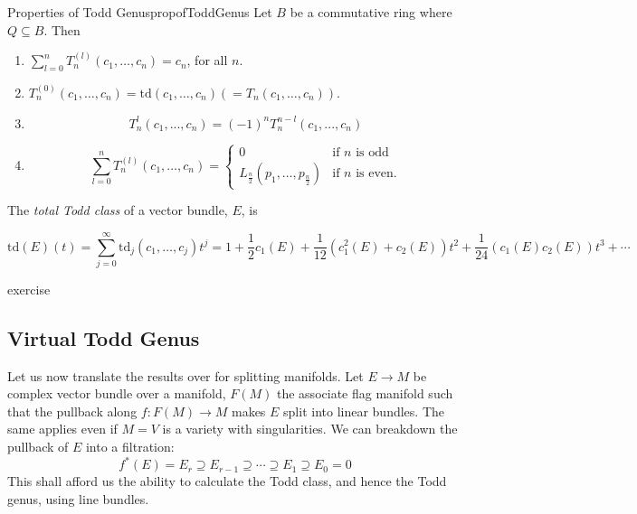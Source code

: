 \documentclass{book}
\newcommand{\sse}{\subseteq}
\begin{document}
\begin{prop}{Properties of Todd Genus}{propofToddGenus}
  Let $B$ be a commutative ring where $Q \sse B$. Then
  \begin{enumerate}
  \item $\sum_{l=0}^n T_n^{(l)}(c_1,\ldots,c_n) = c_n$, for all $n$.

  \item $T_n^{(0)}(c_1,\ldots,c_n) = \text{td}(c_1,\ldots,c_n) (= T_n(c_1,\ldots,c_n))$.
    \item
  \[
    T_n^{l}(c_1, ..., c_n)=(-1)^n T_n^{n-l}(c_1, ..., c_n)
  \]
  \item
  \[
      \sum_{l=0}^n T_n^{(l)}(c_1,\ldots,c_n) = \begin{cases}
          0 & \text{if }n\text{ is odd} \\
          L_{\frac{n}{2}}(p_1,\ldots,p_{\frac{n}{2}}) & \text{if }n\text{ is even.}
      \end{cases}
  \]
  \end{enumerate}

  The \textit{total Todd class} of a vector bundle, $E$, is

\[
    \text{td}(E)(t) = \sum_{j=0}^{\infty} \text{td}_j(c_1,\ldots,c_j)t^j = 1 + \frac{1}{2}c_1(E) + \frac{1}{12}(c_1^2(E) + c_2(E))t^2 + \frac{1}{24}(c_1(E)c_2(E))t^3 + \cdots
\]

\end{prop}

\begin{Proof}
  exercise
\end{Proof}


\subsection{Virtual Todd Genus}\label{sec:virtToddGenus}

Let us now translate the results over for splitting manifolds. Let $E \to M$ be complex vector bundle over a
manifold, $F(M)$ the associate flag manifold such that the pullback along $f: F(M) \to M$ makes $E$ split into
linear bundles. The same applies even if $M = V$ is a variety with singularities. We can breakdown the
pullback of $E$ into a filtration:
\[
  f^*(E) = E_r \supseteq E_{r-1} \supseteq \cdots \supseteq E_1 \supseteq E_0  =0
\]
This shall afford us the ability to calculate the Todd class, and hence the Todd genus, using line bundles.
\end{document}
